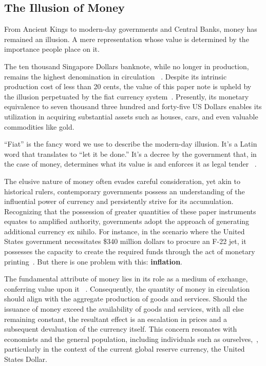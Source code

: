 \subsection{The Illusion of Money}
From Ancient Kings to modern-day governments and Central Banks, money has remained an illusion. A mere representation whose
value is determined by the importance people place on it.

The ten thousand Singapore Dollars banknote, while no longer in production, remains the highest denomination in circulation
~\cite{goodhart1998}. Despite its intrinsic production cost of less than 20 cents, the value of this paper note is upheld
by the illusion perpetuated by the fiat currency system~\cite{gupta2019}. Presently, its monetary equivalence to seven
thousand three hundred and forty-five US Dollars enables its utilization in acquiring substantial assets such as houses,
cars, and even valuable commodities like gold.

“Fiat” is the fancy word we use to describe the modern-day illusion. It's a Latin word that translates to “let it be done.”
It's a decree by the government that, in the case of money, determines what its value is and enforces it as legal tender
~\cite{reinhart2018, friedman2000}.

The elusive nature of money often evades careful consideration, yet akin to historical rulers, contemporary governments
possess an understanding of the influential power of currency and persistently strive for its accumulation. Recognizing
that the possession of greater quantities of these paper instruments equates to amplified authority, governments adopt the
approach of generating additional currency ex nihilo. For instance, in the scenario where the United States government
necessitates \$340 million dollars to procure an F-22 jet, it possesses the capacity to create the required funds through
the act of monetary printing~\cite{graeber2011, mankiw2014}. But there is one problem with this: \textbf{inflation}.

The fundamental attribute of money lies in its role as a medium of exchange, conferring value upon it ~\cite{mankiw2014}.
Consequently, the quantity of money in circulation should align with the aggregate production of goods and services. Should
the issuance of money exceed the availability of goods and services, with all else remaining constant, the resultant effect
is an escalation in prices and a subsequent devaluation of the currency itself. This concern resonates with economists and
the general population, including individuals such as ourselves,~\cite{blinder2010}, particularly in the context of the
current global reserve currency, the United States Dollar.

